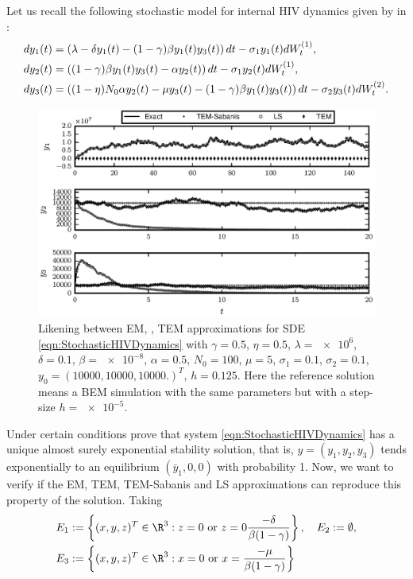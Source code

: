 \begin{example}
	Let us recall the following  stochastic model for internal 
	HIV dynamics given by  \citeauthor{Dalal2008} in \cite{Dalal2008}:
	\begin{align}\label{eqn:StochasticHIVDynamics}
		dy_1(t) &=
		\left(
			\lambda -\delta y_1(t) - (1 - \gamma) \beta y_1(t) y_3(t)
		\right)dt
		-\sigma_1 y_1(t) dW^{(1)}_t, 
		\notag \\
		dy_2(t) &= 	
		\left(
			(1- \gamma) \beta y_1(t) y_3(t) - \alpha y_2(t) 
		\right)dt
		-\sigma_1 y_2(t) dW^{(1)}_t, 
		\\
		dy_3(t) & = 
		\left(
			(1 - \eta) N_0 \alpha y_2(t) 
				-\mu y_3(t)
			-(1 - \gamma ) \beta y_1(t) y_3(t) 
		\right)dt
		- \sigma_2 y_3(t) dW^{(2)}_t.
		\notag
	\end{align}	
	\begin{figure}[h!]
		\centering
		\includegraphics{./papers/paperB/figures/InternalHIVDynamics}
		\caption{
			Likening between EM, \SM, TEM approximations for SDE \eqref{eqn:StochasticHIVDynamics} with
			$\gamma = \num{0.5}$,
			$\eta = \num{0.5}$,
			$\lambda = \num{e6}$, 
			$\delta = \num{0.1}$,
			$\beta = \num{e-8}$,
			$\alpha = \num{0.5}$,
			$N_0= \num{100}$,
			$\mu = \num{5}$,
			$\sigma_1 = \num{0.1}$,
			$\sigma_2 = \num{0.1} $,
			$y_0 = (
			\num{10000},%
			\num{10000},%
			\num{10000}.%
			)^T$,
			$h=\num{0.125}$.
			Here the reference solution means a BEM simulation
			with the same parameters but with a step-size $h=\num{e-5}$.
		}
		\label{fig:InternalHIVDynamics5e-1}
	\end{figure} 
	Under certain conditions \citeauthor{Dalal2008} prove 
	that  system \eqref{eqn:StochasticHIVDynamics} has a unique 
	almost surely exponential stability solution, that is,  $y=(y_1,y_2,y_3)$  tends 
	exponentially to an equilibrium $(\bar{y}_1,0,0)$ with probability 1. 
	Now, we want to verify if  the EM, TEM, TEM-Sabanis \cite{Sabanis2015} and LS approximations can reproduce this 
	property of the solution. Taking 
	\begin{align*}
		E_1&:=\left\{
			(x,y,z)^T \in \R^3:
			z=0 
			\text{ or }
			z=0
			\frac{-\delta}{\beta(1-\gamma)}
		\right\}, \quad
		E_2:=	\emptyset,   \\
		E_3&:=\left\{
			(x,y,z)^T \in \R^3: 
			x=0
			\text{ or }
			x=
			\frac{-\mu}{\beta(1-\gamma)}
		\right\}
	\end{align*}
	 

\end{example}
